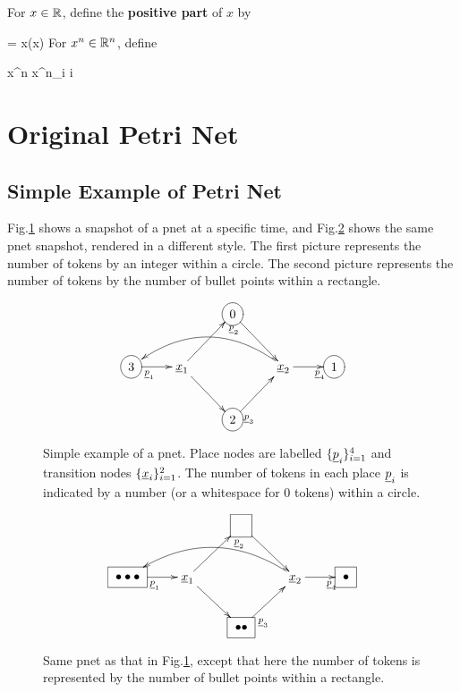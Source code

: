 For $x\in { \mathbb{R}}$, define
the {\bf positive part} of $x$ by

\beq
{} = x\indi(x)
\eeq
For $x^n\in{ \mathbb{R}}^n$, define

\beq
x^n \;\;\;\;
x^n_i \;\;\forall i
\eeq

\section{Original Petri Net}
\subsection{Simple Example of Petri Net}

Fig.\ref{fig-original-pnet-eg-circle}
shows a snapshot of a pnet at a specific time,
and
Fig.\ref{fig-original-pnet-eg-square}
shows the same pnet snapshot, rendered in a different style. The first picture
represents the number of tokens by an integer within a circle.
The second picture represents the number of
tokens by  the number of bullet points within
a rectangle.

\begin{figure}[h!]
$$
\xymatrix{
&&*++[o][F-]{0}\ar[rd]
\\
*++[o][F-]{3}\ar[r]_<<<{\rvp_1}
&\rvx_1\ar[ur]_>{\rvp_2}
\ar[dr]
&&\rvx_2\ar[r]_>>{\rvp_4}
\ar@/_2pc/[lll]
&*++[o][F-]{1}
\\
&&*++[o][F-]{2}\ar[ur]_<{\rvp_3}
}$$
\caption{Simple example of a pnet.
Place nodes are labelled $\{\rvp_i\}_{i=1}^{4}$ and 
transition nodes $\{\rvx_i\}_{i=1}^2$.  The number of tokens in each place $\rvp_i$
is indicated by a number (or a whitespace for 0 tokens) within a circle.}
\label{fig-original-pnet-eg-circle}
\end{figure}


\begin{figure}[h!]
$$
\xymatrix{
&&*++[F-]{\phantom{0}}\ar[rd]
\\
*++[F-]{\bullet\bullet\bullet}\ar[r]_<<<{\rvp_1}
&\rvx_1\ar[ur]_>{\rvp_2}
\ar[dr]
&&\rvx_2\ar[r]_>>{\rvp_4}
\ar@/_2pc/[lll]
&*++[F-]{\bullet}
\\
&&*++[F-]{\bullet\bullet}\ar[ur]_<<{\rvp_3}
}
$$
\caption{Same pnet as that in Fig.\ref{fig-original-pnet-eg-circle},
except that here
the number of tokens is represented by the number of bullet points within a rectangle.}
\label{fig-original-pnet-eg-square}
\end{figure}

